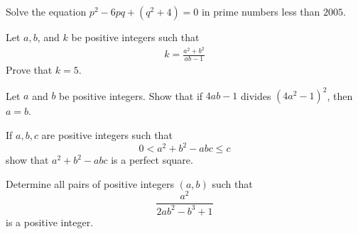 \documentclass{subfile}
\begin{document}

	\begin{problem}[IZHO 2005] %
		Solve the equation  $ p^2 - 6pq + (q^2 + 4) = 0$ in prime numbers less than $2005$.
	\end{problem}

	\begin{problem}
		Let $ a,b$, and $k $ be positive integers such that
			\begin{align*}
				k=\frac{a^2+b^2}{ab-1}
			\end{align*}
		Prove that $ k=5 $.
	\end{problem}

	\begin{problem}[IMO 2007] %
		Let $a$ and $b$ be positive integers. Show that if $4ab - 1$ divides $(4a^{2} - 1)^{2}$, then $a = b$.
	\end{problem}

	\begin{problem}[PEN] %
		If $a, b, c$ are positive integers such that \[0 < a^{2}+b^{2}-abc \le c\] show that $a^{2}+b^{2}-abc$ is a perfect square.
	\end{problem}

	\begin{problem} %
		Determine all pairs of positive integers $(a,b)$ such that \[ \dfrac{a^2}{2ab^2-b^3+1} \] is a positive integer.
	\end{problem}
\end{document}
